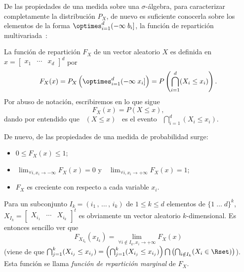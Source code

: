 De las propiedades de una medida sobre una $\sigma$-\'algebra, para caracterizar
completamente la  distribuci\'on $P_X$, de  nuevo es suficiente  conocerla sobre
los elementos de la forma $\displaystyle \optimes_{i=1}^d (-\infty \; b_i]$, \ie
la  funci\'on  de  repartici\'on multivariada~\cite{AshDol99,  AthLah06,  Coh13,
  Bre88, HogMck13}:
%
\begin{definicion}
\label{Def:MP:FuncionReparticionMultivariada}
%
  La funci\'on de repartici\'on $F_X$ de  un vector aleatorio $X$ es definida en
  $x = \begin{bmatrix} x_1 & \cdots & x_d \end{bmatrix}^d$ por
  \[
  F_X(x) =  P_X\left( \optimes_{i=1}^d (-\infty \; x_i]  \right) = P\left(
    \bigcap_{i=1}^d (X_i \le x_i) \right).
  \]
  Por abuso de notaci\'on, escribiremos en lo que sigue
  \[
  F_X(x) = P(X \le x),
  \]
  dando  por entendido  que  \  $(X \le  x)$  \ es  el  evento \  $\displaystyle
  \bigcap_{i=1}^d (X_i \le x_i)$.
\end{definicion}
%
De nuevo, de las propiedades de una medida de probabilidad surge:
%
\begin{itemize}
\item $0 \le F_X(x) \le 1$;
%
\item  $\displaystyle \,  \lim_{\forall i,  x_i  \to -\infty}  F_X(x) =  0$ y  \
  $\displaystyle \, \lim_{\forall i, x_i \to +\infty} F_X(x) = 1$;
%
\item $F_X$ es creciente con respecto a cada variable $x_i$.
\end{itemize}
%
Para un subconjunto $I_k = (i_1 \, , \,  \ldots \, , \, i_k)$ de $1 \le k \le d$
elementos de  $\{ 1 \; \ldots \;  d \}^k$, $X_{I_k} =  \begin{bmatrix} X_{i_1} &
  \cdots   &   X_{i_k}\end{bmatrix}^t$  es   obviamente   un  vector   aleatorio
$k$-dimensional. Es entonces sencillo ver que
%
\[
F_{X_{I_k}}(x_{I_k}) = \lim_{\forall i \notin I_k, x_i \to +\infty} F_X(x)
\label{Pagina:MP:MarginalesF}
\]
%
\Big(viene de  que $\bigcap_{j=1}^k (X_{i_j}  \le x_{i_j}) =  \left( \bigcap_{j=1}^k
  (X_{i_j} \le x_{i_j}) \right) \bigcap  \left( \bigcap_{i \notin I_k} (X_i \in
  \Rset)  \right)$\Big). Esta  funci\'on se llama {\it  funci\'on  de repartici\'on
  marginal} de $F_X$.

